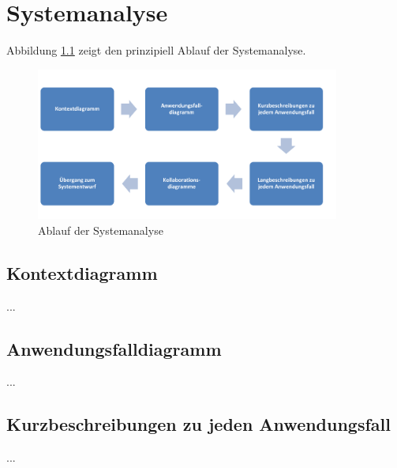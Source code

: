 \chapter{Systemanalyse}
Abbildung \ref{fig:ablauf-der-systemanalyse} zeigt den prinzipiell Ablauf der Systemanalyse.
\begin{figure}[ht]
\centering
\includegraphics[width=10cm]{bilder/ablauf_systemanalyse.pdf}
\caption{Ablauf der Systemanalyse}
\label{fig:ablauf-der-systemanalyse}
\end{figure}

\section{Kontextdiagramm}
...
\section{Anwendungsfalldiagramm}
...
\section{Kurzbeschreibungen zu jeden Anwendungsfall}
...

